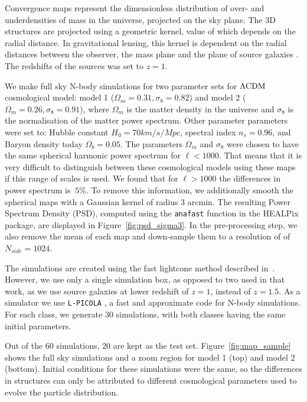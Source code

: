 \documentclass[final,twocolumn,3p,times,authoryear]{elsarticle}
\newcommand{\figref}[1]{Figure~\ref{fig:#1}}
\newcommand{\1}{\b{1}}              %
\newcommand{\0}{\b{0}}              %
\newcommand{\pkg}[1]{\texttt{#1}}
\begin{document}
Convergence maps represent the dimensionless distribution of over- and underdensities of mass in the universe, projected on the sky plane.
The 3D structures are projected using a geometric kernel, value of which depends on the radial distance.
In gravitational lensing, this kernel is dependent on the radial distances between the observer, the mass plane and the plane of source galaxies \citep[see][for review of gravitational lensing]{bartelman2010gravitationallensing}.
The redshifts of the sources was set to $z=1$.

We make full sky N-body simulations for two parameter sets for $\Lambda\rm{CDM} $ cosmological model: model 1 ($\Omega_m=0.31, \sigma_8=0.82$) and model 2 ($\Omega_m=0.26, \sigma_8=0.91$), where $\Omega_m$ is the matter density in the universe and $\sigma_8$ is the normalisation of the matter power spectrum.
Other parameter parameters were set to: Hubble constant $H_0=70 km/s/Mpc$, spectral index $n_s=0.96$, and Baryon density today $\Omega_b=0.05$.
The parameters $\Omega_m$ and $\sigma_8$ were chosen to have the same spherical harmonic power spectrum for $\ell<1000$.
That means that it is very difficult to distinguish between these cosmological models using these maps if this range of scales is used.
We found that for $\ell>1000$ the differences in power spectrum is $~5\%$.
To remove this information, we additionally smooth the spherical maps with a Gaussian kernel of radius $3$ arcmin.
The resulting Power Spectrum Density (PSD), computed using the \texttt{anafast} function in the HEALPix package, are displayed in \figref{psd_sigma3}.
In the pre-processing step, we also remove the mean of each map and down-sample them to a resolution of of $N_{side}=1024$.


The simulations are created using the fast lightcone method described in~\citep{sgier2018fastgeneration}.
However, we use only a single simulation box, as opposed to two used in that work, as we use source galaxies at lower redshift of $z=1$, instead of $z=1.5$.
As a simulator we use \pkg{L-PICOLA} \citep{howlett2015lpicola}, a fast and approximate code for N-body simulations.
For each class, we generate $30$ simulations, with both classes having the same initial parameters.

Out of the $60$ simulations, $20$ are kept as the test set.
\figref{map_sample} shows the full sky simulations and a zoom region for model 1 (top) and model 2 (bottom).
Initial conditions for these simulations were the same, so the differences in structures can only be attributed to different cosmological parameters used to evolve the particle distribution.
\end{document}
